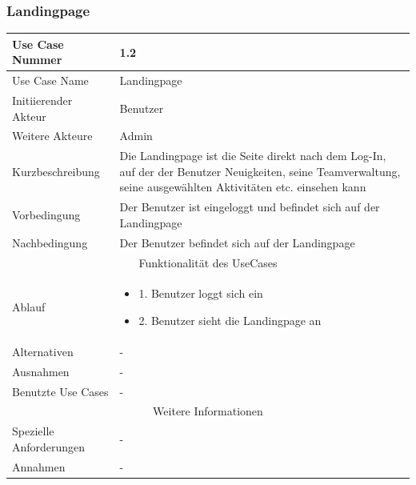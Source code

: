 \documentclass[10pt,a4paper]{article}
\begin{document}
		\subsubsection{Landingpage}
		\begin{tabular}{|l|p{.5\linewidth}|}
			\hline Use Case Nummer & 1.2 \\ 
			\hline Use Case Name & Landingpage \\ 
			\hline Initiierender Akteur & Benutzer \\
			\hline Weitere Akteure & Admin \\
			\hline Kurzbeschreibung & Die Landingpage ist die Seite direkt nach dem Log-In, auf der der Benutzer Neuigkeiten, seine Teamverwaltung, seine ausgewählten Aktivitäten etc. einsehen kann \\
			\hline Vorbedingung & Der Benutzer ist eingeloggt und befindet sich auf der Landingpage \\
			\hline Nachbedingung & Der Benutzer befindet sich auf der Landingpage \\
			\hline \multicolumn{2}{|c|}{Funktionalität des UseCases}\\
			\hline Ablauf & \begin{itemize}
				\item 1. Benutzer loggt sich ein
				\item 2. Benutzer sieht die Landingpage an
			\end{itemize} \\
			\hline Alternativen & - \\
			\hline Ausnahmen & - \\
			\hline Benutzte Use Cases & - \\
			\hline \multicolumn{2}{|c|}{Weitere Informationen} \\
			\hline Spezielle Anforderungen & - \\
			\hline Annahmen & - \\
			\hline
		\end{tabular}
		
\end{document}

